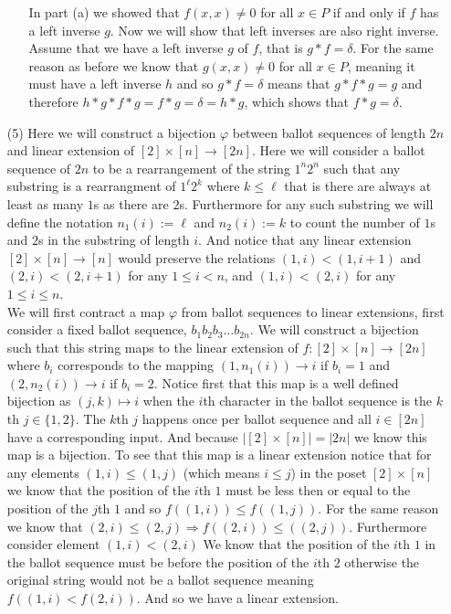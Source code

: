 \documentclass[12pt]{amsart}
\theoremstyle{definition}
\newcommand{\ra}{\rightarrow}
\let\phi\varphi
\begin{document}
\begin{itemize}
\begin{enumerate}[label=(\alph*)]
    In part (a) we showed that $f(x,x)\neq 0$ for all $x\in P$ if and only if $f$ has a left inverse $g$. Now we will show that left inverses are also right inverse. Assume that we have a left inverse $g$ of $f$, that is $g*f=\delta$. For the same reason as before we know that $g(x,x)\neq 0$ for all $x\in P$, meaning it must have a left inverse $h$ and so $g*f=\delta$ means that $g*f*g=g$ and therefore  $h*g*f*g=f*g=\delta=h*g$, which shows that $f*g=\delta$.\\
\end{enumerate}

\item[(5)] %
Here we will construct a bijection $\phi$ between ballot sequences of length $2n$ and linear extension of $[2]\times [n]\ra [2n]$. Here we will consider a ballot sequence of $2n$ to be a rearrangement of the string $1^n2^n$ such that any substring is a rearrangment of $1^\ell2^k$ where $k\leq\ell$ that is there are always at least as many $1$s as there are $2$s. Furthermore for any such substring we will define the notation $n_1(i):=\ell$ and $n_2(i):=k$ to count the number of $1$s and $2$s in the substring of length $i$. And notice that any linear extension $[2]\times [n]\ra [n]$ would preserve the relations $(1,i)<(1,i+1)$ and $(2,i)<(2,i+1)$ for any $1\leq i<n$, and $(1,i)<(2,i)$ for any $1\leq i\leq n$.\\

We will first contract a map $\phi$ from ballot sequences to linear extensions, first consider a fixed ballot sequence, $b_1b_2b_3\dots b_{2n}$. We will construct a bijection such that this string maps to the linear extension of $f:[2]\times [n]\ra [2n]$ where $b_i$ corresponds to the mapping $(1,n_1(i))\ra i$ if $b_i=1$ and $(2,n_2(i))\ra i$ if $b_i=2$. Notice first that this map is a well defined bijection as $(j,k)\mapsto i$ when the $i$th character in the ballot sequence is the $k$th $j\in\{1,2\}$. The $k$th $j$ happens once per ballot sequence and all $i\in[2n]$ have a corresponding input. And because $|[2]\times [n]|=|2n|$ we know this map is a bijection. To see that this map is a linear extension notice that for any elements $(1,i)\leq (1,j)$ (which means $i\leq j$) in the poset $[2]\times[n]$ we know that the position of the $i$th $1$ must be less then or equal to the position of the $j$th $1$ and so $f((1,i))\leq f((1,j))$. For the same reason we know that $(2,i)\leq (2,j)\Rightarrow f((2,i))\leq ((2,j))$. Furthermore consider element $(1,i)< (2,i)$ We know that the position of the $i$th $1$ in the ballot sequence must be before the position of the $i$th $2$ otherwise the original string would not be a ballot sequence meaning $f((1,i)<f (2,i))$. And so we have a linear extension.\\


\end{itemize}
\end{document}
